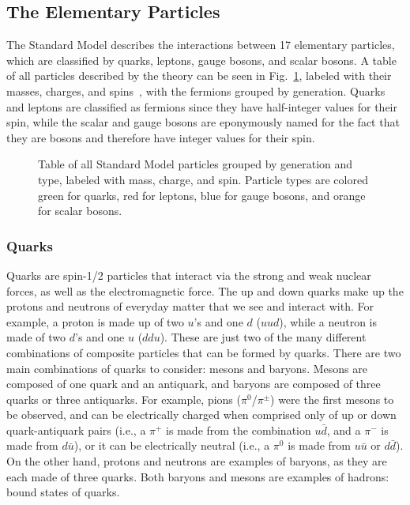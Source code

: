 \subsection{The Elementary Particles}
\label{subsec:particles}

The Standard Model describes the interactions between 17 elementary particles, which are classified by quarks, leptons, gauge bosons, and scalar bosons.
A table of all particles described by the theory can be seen in Fig.~\ref{fig:standardModel}, labeled with their masses, charges, and spins~\cite{PhysRevD.98.030001}, with the fermions grouped by generation.
Quarks and leptons are classified as fermions since they have half-integer values for their spin, while the scalar and gauge bosons are eponymously named for the fact that they are bosons and therefore have integer values for their spin. %

\begin{figure}[htbp]
  \centering
  
  \caption{Table of all Standard Model particles grouped by generation and type, labeled with mass, charge, and spin. Particle types are colored green for quarks, red for leptons, blue for gauge bosons, and orange for scalar bosons.}
  \label{fig:standardModel}
\end{figure}

\subsubsection{Quarks}
Quarks are spin-1/2 particles that interact via the strong and weak nuclear forces, as well as the electromagnetic force.
The up and down quarks make up the protons and neutrons of everyday matter that we see and interact with.
For example, a proton is made up of two $u$'s and one $d$ ($uud$), while a neutron is made of two $d$'s and one $u$ ($ddu$).
These are just two of the many different combinations of composite particles that can be formed by quarks.
There are two main combinations of quarks to consider: mesons and baryons.
Mesons are composed of one quark and an antiquark, and baryons are composed of three quarks or three antiquarks. %
For example, pions ($\pi^0$/$\pi^\pm$) were the first mesons to be observed, and can be electrically charged when comprised only of up or down quark-antiquark pairs (i.e., a $\pi^+$ is made from the combination $u\bar{d}$, and a $\pi^-$ is made from $d\bar{u}$), or it can be electrically neutral (i.e., a $\pi^0$ is made from $u\bar{u}$ or $d\bar{d}$).
On the other hand, protons and neutrons are examples of baryons, as they are each made of three quarks.
Both baryons and mesons are examples of hadrons: bound states of quarks.

